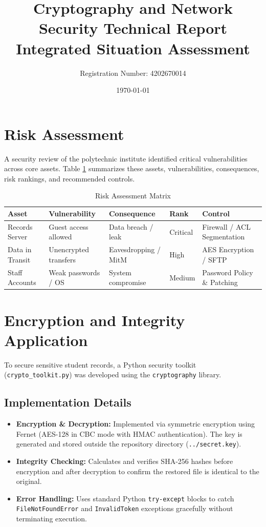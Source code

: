 \documentclass[12pt,a4paper]{article}
\title{\textbf{Cryptography and Network Security Technical Report}\\ \large Integrated Situation Assessment}
\author{Registration Number: 4202670014}
\date{\today}
\begin{document}
\maketitle

\section{Risk Assessment}
A security review of the polytechnic institute identified critical vulnerabilities across core assets. Table \ref{tab:risks} summarizes these assets, vulnerabilities, consequences, risk rankings, and recommended controls.

\begin{table}[h!]
\centering
\small
\begin{tabular}{@{}lllll@{}}
\toprule
\textbf{Asset} & \textbf{Vulnerability} & \textbf{Consequence} & \textbf{Rank} & \textbf{Control} \\ \midrule
Records Server & Guest access allowed & Data breach / leak & Critical & Firewall / ACL Segmentation \\
Data in Transit & Unencrypted transfers & Eavesdropping / MitM & High & AES Encryption / SFTP \\
Staff Accounts & Weak passwords / OS & System compromise & Medium & Password Policy \& Patching \\ \bottomrule
\end{tabular}
\caption{Risk Assessment Matrix}
\label{tab:risks}
\end{table}

\section{Encryption and Integrity Application}
To secure sensitive student records, a Python security toolkit (\texttt{crypto\_toolkit.py}) was developed using the \texttt{cryptography} library.

\subsection{Implementation Details}
\begin{itemize}
    \item \textbf{Encryption \& Decryption:} Implemented via symmetric encryption using Fernet (AES-128 in CBC mode with HMAC authentication). The key is generated and stored outside the repository directory (\texttt{../secret.key}).
    \item \textbf{Integrity Checking:} Calculates and verifies SHA-256 hashes before encryption and after decryption to confirm the restored file is identical to the original.
    \item \textbf{Error Handling:} Uses standard Python \texttt{try-except} blocks to catch \texttt{FileNotFoundError} and \texttt{InvalidToken} exceptions gracefully without terminating execution.
\end{itemize}
\end{document}
